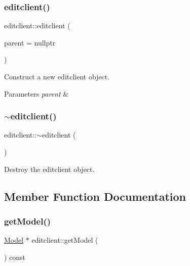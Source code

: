 \subsubsection{\texorpdfstring{editclient()}{editclient()}}
{\footnotesize\ttfamily editclient\+::editclient (\begin{DoxyParamCaption}\item[{Q\+Widget $\ast$}]{parent = {\ttfamily nullptr} }\end{DoxyParamCaption})\hspace{0.3cm}{\ttfamily [explicit]}}



Construct a new editclient object. 


\begin{DoxyParams}{Parameters}
{\em parent} & \\
\hline
\end{DoxyParams}
\mbox{\label{classeditclient_ac881d2dd9b89bfec7632f85efe967d21}} 
\subsubsection{\texorpdfstring{$\sim$editclient()}{~editclient()}}
{\footnotesize\ttfamily editclient\+::$\sim$editclient (\begin{DoxyParamCaption}{ }\end{DoxyParamCaption})}



Destroy the editclient object. 



\subsection{Member Function Documentation}
\mbox{\label{classeditclient_a134cd4aaa1c6dcef1a1c4455569bf51d}} 
\subsubsection{\texorpdfstring{get\+Model()}{getModel()}}
{\footnotesize\ttfamily \hyperlink{classModel}{Model} $\ast$ editclient\+::get\+Model (\begin{DoxyParamCaption}{ }\end{DoxyParamCaption}) const}



